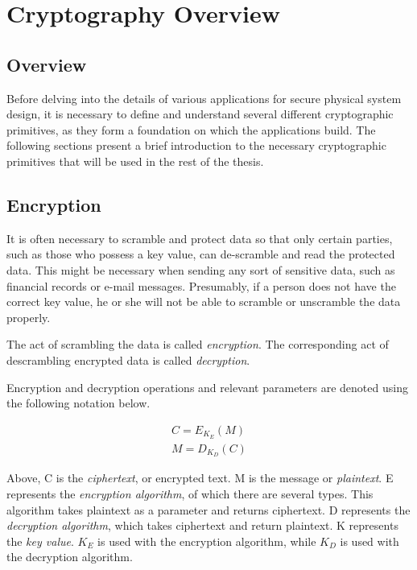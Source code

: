 
\chapter{Cryptography Overview}
\label{chapter:cryptographyoverview}

\section{Overview}
Before delving into the details of various applications for secure physical system design,
it is necessary to define and understand several different
cryptographic primitives, as they form a foundation on which the applications build. The following sections present a brief
introduction to the necessary cryptographic primitives that will be used in the rest of the thesis.

\section{Encryption}
It is often necessary to scramble and protect data so that only certain parties, such as those who
possess a key value, can de-scramble and read the protected data. This might be necessary when
sending any sort of sensitive data, such as financial records or e-mail messages. Presumably, if a 
person does not have the correct key value, he or she will not be able to scramble or unscramble
the data properly.

The act of scrambling the data is called \emph{encryption}. The corresponding act of descrambling
encrypted data is called \emph{decryption}.

Encryption and decryption operations and relevant parameters are denoted using the following notation below.

\begin{align}
C = E_{K_E}(M) \\
M = D_{K_D}(C)
\end{align}

Above, C is the \emph{ciphertext}, or encrypted text.  
M is the message or \emph{plaintext}. 
E represents the \emph{encryption algorithm}, of which there are several types. This algorithm takes plaintext as a parameter and returns ciphertext.
D represents the \emph{decryption algorithm}, which takes ciphertext and return plaintext.
K represents the \emph{key value}. $K_E$ is used with the encryption algorithm, while $K_D$ is used with the decryption algorithm.

